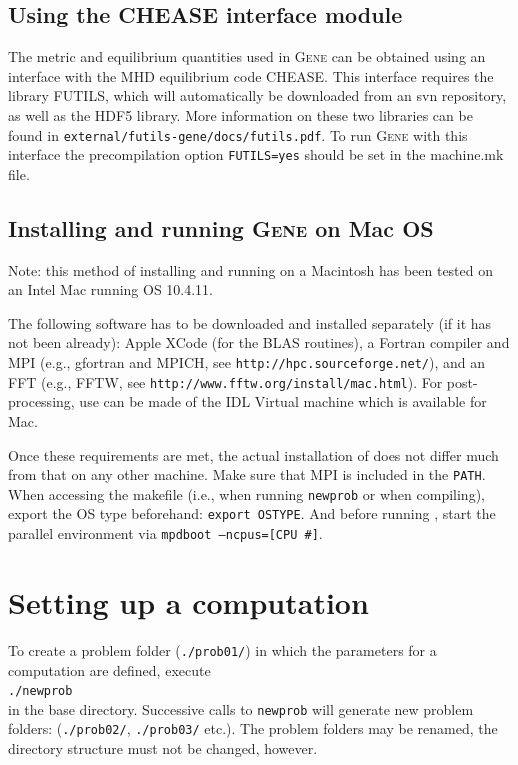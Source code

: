 \documentclass[12pt]{article}
\begin{document}
\subsection{Using the CHEASE interface module}
The metric and equilibrium quantities used in \textsc{Gene} can be obtained using an
interface with the MHD equilibrium code CHEASE. This interface requires the
library FUTILS, which will automatically be downloaded from an svn repository, as well
as the HDF5 library. More information on these two libraries can be found  in
\texttt{external/futils-gene/docs/futils.pdf}. To run \textsc{Gene} with this interface
the precompilation option \texttt{FUTILS=yes} should be set in the
machine.mk file.

\subsection{Installing and running \textsc{Gene} on Mac OS}

Note: this method of installing and running \gene on a Macintosh has
been tested on an Intel Mac running OS 10.4.11.

The following software has to be downloaded and installed separately
(if it has not been already): Apple XCode (for the BLAS routines), a
Fortran compiler and MPI (e.g., gfortran and MPICH, see
\texttt{http://hpc.sourceforge.net/}), and an FFT (e.g., FFTW, see
\texttt{http://www.fftw.org/install/mac.html}). For post-processing, use
can be made of the IDL Virtual machine which is available for Mac.

Once these requirements are met, the actual installation of \gene does
not differ much from that on any other machine. Make sure that MPI is
included in the \texttt{PATH}. When accessing the makefile (i.e., when
running \texttt{newprob} or when compiling), export the OS type
beforehand: \texttt{export OSTYPE}. And before running \gene, start
the parallel environment via \texttt{mpdboot --ncpus=[CPU \#]}.

\newpage


\section{Setting up a computation}

To create a problem folder (\texttt{./prob01/}) in which the parameters for a computation are defined,
execute \\
\qquad\verb|./newprob| \\
in the \gene base directory. Successive calls to \verb|newprob| will generate new problem folders:
(\texttt{./prob02/}, \texttt{./prob03/} etc.). The problem folders may be renamed, the directory
structure must not be changed, however.
\end{document}
